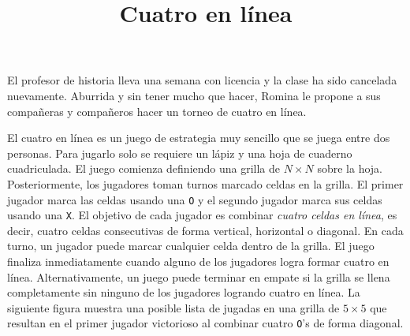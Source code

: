 \documentclass{oci}
\title{Cuatro en línea}
\begin{document}
\begin{problemDescription}
  El profesor de historia lleva una semana con
  licencia y la clase ha sido cancelada nuevamente.
  Aburrida y sin tener mucho que hacer, Romina le
  propone a sus compañeras y compañeros hacer un torneo
  de cuatro en línea.

  El cuatro en línea es un juego de estrategia
  muy sencillo que se juega entre dos personas.
  Para jugarlo solo se requiere un lápiz y una hoja de
  cuaderno cuadriculada.
  El juego comienza definiendo una grilla de
  $N\times N$ sobre la hoja.
  Posteriormente, los jugadores toman turnos
  marcado celdas en la grilla.
  El primer jugador marca las celdas usando una \texttt{O}
  y el segundo jugador marca sus celdas usando una \texttt{X}.
  El objetivo de cada jugador es combinar \emph{cuatro celdas
  en línea}, es decir, cuatro celdas consecutivas de forma
  vertical, horizontal o diagonal.
  En cada turno, un jugador puede marcar cualquier celda dentro
  de la grilla.
  El juego finaliza inmediatamente cuando alguno de los jugadores
  logra formar cuatro en línea.
  Alternativamente, un juego puede terminar en empate si la grilla
  se llena completamente sin ninguno de los jugadores logrando
  cuatro en línea.
  La siguiente figura muestra una posible lista de jugadas
  en una grilla de $5\times 5$ que resultan en el primer jugador
  victorioso al combinar cuatro \texttt{O}'s de forma diagonal.
  \begin{center}
  \begin{minipage}{0.8\textwidth}


\end{minipage}
\end{center}
\end{problemDescription}
\end{document}
